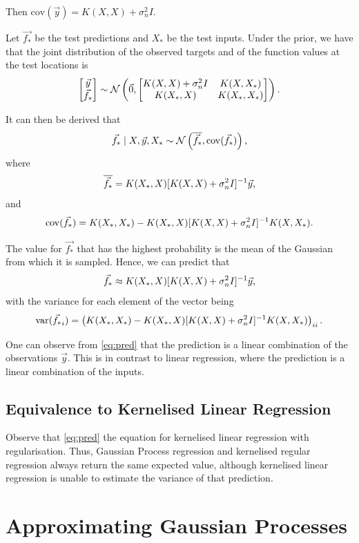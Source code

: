 \documentclass[11pt,twoside]{report}
\newcommand\cN{\mathcal{N}}
\newcommand\cov{\mathrm{cov}}
\newcommand\var{\mathrm{var}}
\begin{document}
Then $\cov(\vec{y}) = K(X, X) + \sigma_n^2I$.

Let $\vec{f_*}$ be the test predictions and $X_*$ be the test inputs. Under the prior, we have that the joint distribution of the observed targets and of the function values at the test locations is \[
    \begin{bmatrix}
        \vec{y} \\ \vec{f_*}
    \end{bmatrix} \sim \cN\left(\vec0, \begin{bmatrix}
        K(X, X) + \sigma_n^2I & K(X, X_*) \\
        K(X_*, X) & K(X_*, X_*)
    \end{bmatrix}\right)\text.
\]

It can then be derived that \[
    \vec{f_*} \mid X, \vec{y}, X_* \sim \cN\left(\overline{\vec{f_*}}, \cov(\vec{f_*})\right)\text,
\] where \[
    \overline{\vec{f_*}} = K(X_*, X)[K(X, X) + \sigma_n^2I]^{-1}\vec{y}\text,
\] and \[
    \cov(\vec{f_*}) = K(X_*, X_*) - K(X_*, X)[K(X, X) + \sigma_n^2I]^{-1}K(X, X_*)\text.
\]

The value for $\vec{f_*}$ that has the highest probability is the mean of the Gaussian from which it is sampled. Hence, we can predict that \begin{equation}
    \label{eq:pred}
    \vec{f_*} \approx K(X_*, X)[K(X, X) + \sigma_n^2I]^{-1}\vec{y}\text,
\end{equation} with the variance for each element of the vector being\[
    \var(\vec{f_*}_i) = \left( K(X_*, X_*) - K(X_*, X)[K(X, X) + \sigma_n^2I]^{-1}K(X, X_*) \right)_{ii}\text.
\]

One can observe from \cref{eq:pred} that the prediction is a linear combination of the observations $\vec{y}$. This is in contrast to linear regression, where the prediction is a linear combination of the inputs.

\subsection{Equivalence to Kernelised Linear Regression}

Observe that \cref{eq:pred} the equation for kernelised linear regression with regularisation. Thus, Gaussian Process regression and kernelised regular regression always return the same expected value, although kernelised linear regression is unable to estimate the variance of that prediction.

\section{Approximating Gaussian Processes}
\end{document}

